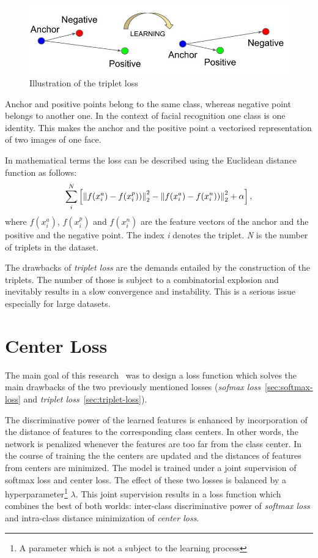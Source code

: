 \begin{figure}[H]
    \centering
    \includegraphics[width=\columnwidth]{images/losses/tripletloss.jpeg}
    \caption{Illustration of the triplet loss~\cite{TripletLoss}}
    \label{fig:tripletloss}
\end{figure}

Anchor and positive points belong to the same class, whereas negative point belongs to another one.
In the context of facial recognition one class is one identity.
This makes the anchor and the positive point a vectorised representation of two images of one face.

In mathematical terms the loss can be described using the Euclidean distance function as follows:
\begin{equation}
    \sum_{i}^{N} \left[ \left\lVert f(x_{i}^{a}) - f(x_{i}^{p}))\right\rVert^2_2
    - \left\lVert f(x_{i}^{a}) - f(x_{i}^{n}))\right\rVert^2_2 + \alpha \right],
\end{equation}
where $f(x_{i}^{a})$, $f(x_{i}^{p})$ and $f(x_{i}^{n})$ are the feature vectors of the anchor and the positive and the
negative point.
The index \textit{i} denotes the triplet.
\textit{N} is the number of triplets in the dataset.

The drawbacks of \textit{triplet loss} are the demands entailed by the construction of the triplets.
The number of those is subject to a combinatorial explosion and inevitably results in a slow convergence and
instability.
This is a serious issue especially for large datasets.

\section{Center Loss}\label{sec:center-loss}
The main goal of this research~\cite{CenterLoss} was to design a loss function which solves the main drawbacks of
the two previously mentioned losses
(\textit{sofmax loss}~\ref{sec:softmax-loss} and \textit{triplet loss}~\ref{sec:triplet-loss}).

The discriminative power of the learned features is enhanced by incorporation of the distance of features to the
corresponding class centers.
In other words, the network is penalized whenever the features are too far from the class center.
In the course of training the the centers are updated and the distances of features from centers are minimized.
The model is trained under a joint supervision of softmax loss and center loss.
The effect of these two losses is balanced by a hyperparameter\footnote{A parameter which is not a subject to the
learning process} $\lambda$.
This joint supervision results in a loss function which combines the best of both worlds:
inter-class discriminative power of \textit{softmax loss} and intra-class distance minimization of \textit{center loss}.

